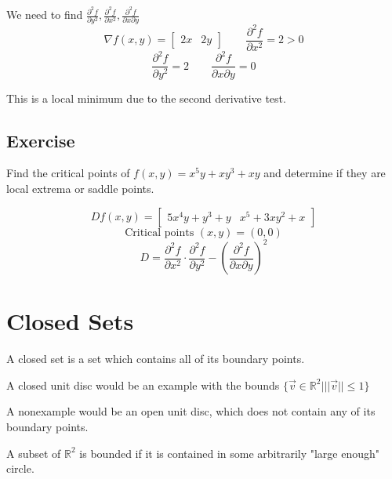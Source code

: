 \documentclass{article}
\begin{document}
We need to find $\frac{\partial^2 f}{\partial y^2},\frac{\partial^2 f}{\partial x^2},\frac{\partial^2 f}{\partial x \partial y}$
\[\nabla f(x,y)=\begin{bmatrix}
    2x&2y
\end{bmatrix}\qquad \frac{\partial^2 f}{\partial x^2}=2>0\]
\[\frac{\partial^2 f}{\partial y^2}=2\qquad \frac{\partial^2 f}{\partial x \partial y}=0\]

This is a local minimum due to the second derivative test.

\subsection*{Exercise}
Find the critical points of $f(x,y)=x^{5}y+xy^3+xy$ and determine if they are local extrema or saddle points.

\[Df(x,y)=\begin{bmatrix}
    5x^4y+y^3+y& x^5+3xy^2+x
\end{bmatrix}\]
\[\mbox{Critical points }(x,y)=(0,0)\]
\[D=\frac{\partial^2 f}{\partial x^2}\cdot \frac{\partial^2 f}{\partial y^2}-(\frac{\partial^2 f}{\partial x \partial y})^2\]

\section{Closed Sets}
A closed set is a set which contains all of its boundary points. 

A closed unit disc would be an example with the bounds $\{\vec{v}\in \mathbb{R}^2\Big| ||\vec{v}||\leq 1 \}$

A nonexample would be an open unit disc, which does not contain any of its boundary points. 

A subset of $\mathbb{R}^2$ is bounded if it is contained in some arbitrarily "large enough" circle.
\end{document}
